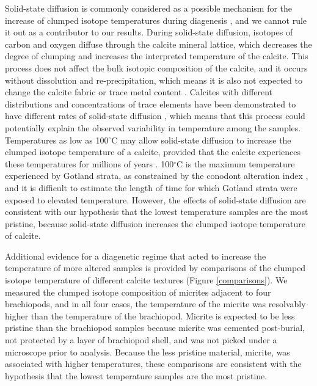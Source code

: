 \documentclass[5p, authoryear]{elsarticle}
\begin{document}
Solid-state diffusion is commonly considered as a possible mechanism for the increase of clumped isotope temperatures during diagenesis \citep{Dennis2013, Huntington2011, Quade2013, VanDeVelde2013}, and we cannot rule it out as a contributor to our results. During solid-state diffusion, isotopes of carbon and oxygen diffuse through the calcite mineral lattice, which decreases the degree of clumping and increases the interpreted temperature of the calcite. This process does not affect the bulk isotopic composition of the calcite, and it occurs without dissolution and re-precipitation, which means it is also not expected to change the calcite fabric or trace metal content \citep{Eiler2011}. Calcites with different distributions and concentrations of trace elements have been demonstrated to have different rates of solid-state diffusion \citep{Passey2012}, which means that this process could potentially explain the observed variability in temperature among the samples. Temperatures as low as 100$^{\circ}$C may allow solid-state diffusion to increase the clumped isotope temperature of a calcite, provided that the calcite experiences these temperatures for millions of years \citep{Dennis2010}. 100$^{\circ}$C is the maximum temperature experienced by Gotland strata, as constrained by the conodont alteration index \citep{Jeppsson1983, Wenzel2000}, and it is difficult to estimate the length of time for which Gotland strata were exposed to elevated temperature. However, the effects of solid-state diffusion are consistent with our hypothesis that the lowest temperature samples are the most pristine, because solid-state diffusion increases the clumped isotope temperature of calcite. 

Additional evidence for a diagenetic regime that acted to increase the temperature of more altered samples is provided by comparisons of the clumped isotope temperature of different calcite textures (Figure \ref{comparisons}). We measured the clumped isotope composition of micrites adjacent to four brachiopods, and in all four cases, the temperature of the micrite was resolvably higher than the temperature of the brachiopod. Micrite is expected to be less pristine than the brachiopod samples because micrite was cemented post-burial, not protected by a layer of brachiopod shell, and was not picked under a microscope prior to analysis. Because the less pristine material, micrite, was associated with higher temperatures, these comparisons are consistent with the hypothesis that the lowest temperature samples are the most pristine.
\end{document}
